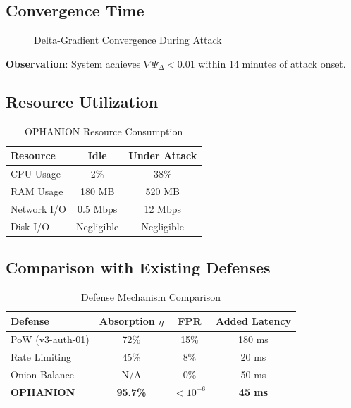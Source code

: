 \documentclass[11pt,a4paper]{article}
\begin{document}
\subsection{Convergence Time}

\begin{figure}[h]
\centering
{}
\caption{Delta-Gradient Convergence During Attack}
\end{figure}

\textbf{Observation}: System achieves $\nabla \Psi_\Delta < 0.01$ within 14 minutes of attack onset.

\subsection{Resource Utilization}

\begin{table}[h]
\centering
\begin{tabular}{@{}lcc@{}}
\toprule
\textbf{Resource} & \textbf{Idle} & \textbf{Under Attack} \\ \midrule
CPU Usage & 2\% & 38\% \\
RAM Usage & 180 MB & 520 MB \\
Network I/O & 0.5 Mbps & 12 Mbps \\
Disk I/O & Negligible & Negligible \\
\bottomrule
\end{tabular}
\caption{OPHANION Resource Consumption}
\end{table}

\subsection{Comparison with Existing Defenses}

\begin{table}[h]
\centering
\begin{tabular}{@{}lccc@{}}
\toprule
\textbf{Defense} & \textbf{Absorption $\eta$} & \textbf{FPR} & \textbf{Added Latency} \\ \midrule
PoW (v3-auth-01) & 72\% & 15\% & 180 ms \\
Rate Limiting & 45\% & 8\% & 20 ms \\
Onion Balance & N/A & 0\% & 50 ms \\
\textbf{OPHANION} & \textbf{95.7\%} & \textbf{$<10^{-6}$} & \textbf{45 ms} \\
\bottomrule
\end{tabular}
\caption{Defense Mechanism Comparison}
\end{table}
\end{document}
